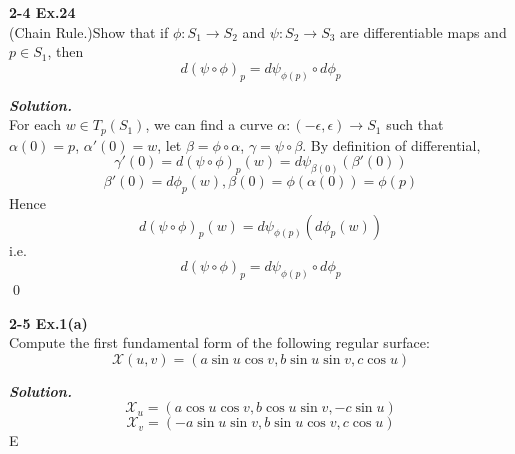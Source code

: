 \documentclass{article}
\begin{document}
\par
\textbf{2-4 Ex.24}\\
(Chain Rule.)Show that if $\phi: S_1 \to S_2$ and 
$\psi: S_2 \to S_3$ are differentiable maps and $p \in S_1$,
then
$$
    d(\psi \circ \phi)_p = d \psi_{\phi(p)} \circ d \phi_p
$$

\par
\textbf{\textit{Solution.}}\\
For each $w \in T_p(S_1)$, we can find a curve
$\alpha: (-\epsilon, \epsilon) \to S_1$ such that
$\alpha(0)=p$, $\alpha'(0)=w$, let $\beta = \phi \circ \alpha$,
$\gamma = \psi \circ \beta$.
By definition of differential,
$$
    \gamma'(0) = d(\psi \circ \phi)_p(w) = d\psi_{\beta(0)}(\beta'(0))
$$
$$
    \beta'(0) = d\phi_p(w), \beta(0)=\phi(\alpha(0))=\phi(p)
$$
Hence
$$
d(\psi \circ \phi)_p(w) = d\psi_{\phi(p)}(d\phi_p(w))
$$
i.e.
$$
d(\psi \circ \phi)_p = d\psi_{\phi(p)} \circ d\phi_p
$$
\qed

\par
\textbf{2-5 Ex.1(a)}\\
Compute the first fundamental form of the following
regular surface:
$$
\mathcal{X}(u,v)=(a \sin u \cos v, b \sin u \sin v, c \cos u)
$$

\par
\textbf{\textit{Solution.}}\\
$$
    \mathcal{X}_u = (a \cos u \cos v, b \cos u \sin v, -c \sin u)
$$
$$
    \mathcal{X}_v = (-a \sin u \sin v, b \sin u \cos v, c \cos u)
$$
E
\end{document}
